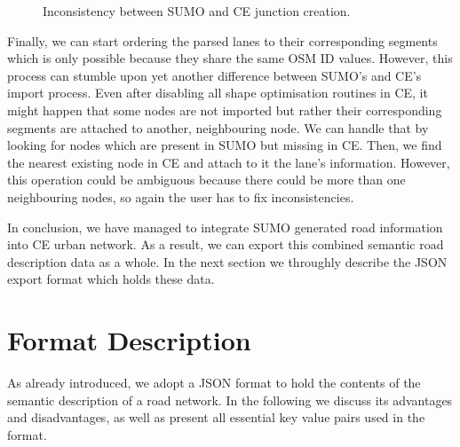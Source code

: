 \begin{figure}[htb]
	\centering
	\caption{Inconsistency between SUMO and CE junction creation.}
\end{figure}

Finally, we can start ordering the parsed lanes to their corresponding segments which is only possible because they share the same OSM ID values. However, this process can stumble upon yet another difference between SUMO's and CE's import process. Even after disabling all shape optimisation routines in CE, it might happen that some nodes are not imported but rather their corresponding segments are attached to another, neighbouring node. We can handle that by looking for nodes which are present in SUMO but missing in CE. Then, we find the nearest existing node in CE and attach to it the lane's information. However, this operation could be ambiguous because there could be more than one neighbouring nodes, so again the user has to fix inconsistencies. 

In conclusion, we have managed to integrate SUMO generated road information into CE urban network. As a result, we can export this combined semantic road description data as a whole. In the next section we throughly describe the JSON export format which holds these data.

\section{Format Description}
\label{sec:format}
As already introduced, we adopt a JSON format to hold the contents of the semantic description of a road network. In the following we discuss its advantages and disadvantages, as well as present all essential key value pairs used in the format.

